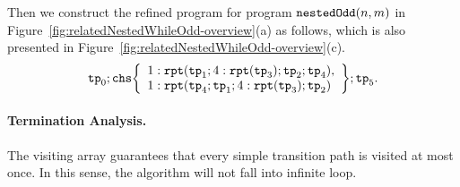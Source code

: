 Then we construct the refined program for program $\mathtt{nestedOdd}(n, m)$ in Figure~\ref{fig:relatedNestedWhileOdd-overview}(a) as follows, which is also presented in Figure~\ref{fig:relatedNestedWhileOdd-overview}(c).
\[
 \tpath_0 ; \rpchoose{ 
 \begin{array}{l}
    1: \rprepeat(\tpath_1; 4:\rprepeat(\tpath_3); \tpath_2; \tpath_4), \\
    1: \rprepeat(\tpath_4; \tpath_1; 4:\rprepeat(\tpath_3); \tpath_2) 
 \end{array}
 }; \tpath_5.
\]


\paragraph{Termination Analysis.}
The visiting array guarantees that every simple transition path is visited at most once.
In this sense, the algorithm will not fall into infinite loop.

